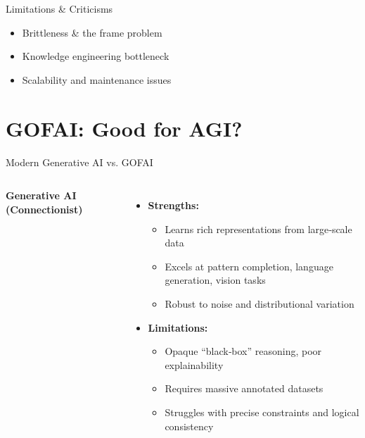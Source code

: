 \documentclass[german,10pt]{beamer}
\begin{document}
\begin{frame}{Limitations \& Criticisms}
\begin{itemize}
  \item Brittleness \& the frame problem
  \item Knowledge engineering bottleneck
  \item Scalability and maintenance issues
\end{itemize}
\end{frame}
\section{GOFAI: Good for AGI?}

\begin{frame}{Modern Generative AI vs. GOFAI}
  \begin{columns}[t]
      \textbf{Generative AI (Connectionist)}  
      \begin{itemize}
        \item \textbf{Strengths:}
          \begin{itemize}
            \item Learns rich representations from large‑scale data  
            \item Excels at pattern completion, language generation, vision tasks  
            \item Robust to noise and distributional variation
          \end{itemize}
        \item \textbf{Limitations:}
          \begin{itemize}
            \item Opaque “black‑box” reasoning, poor explainability  
            \item Requires massive annotated datasets  
            \item Struggles with precise constraints and logical consistency
          \end{itemize}
      \end{itemize}


\end{columns}
\end{frame}
\end{document}
